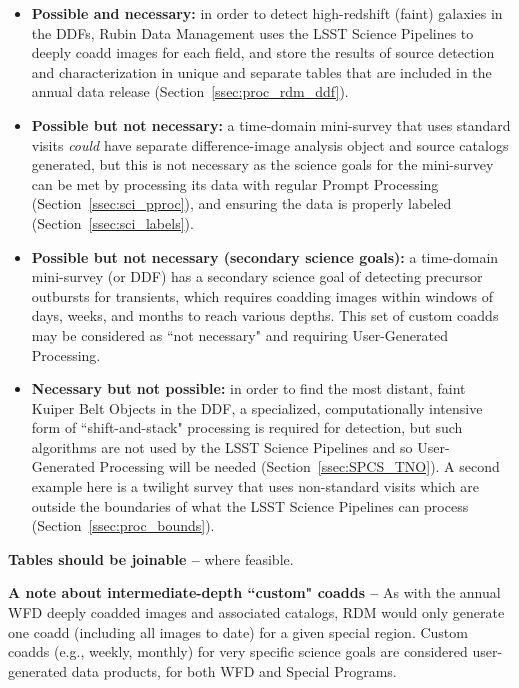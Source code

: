 \begin{itemize}

\item \textbf{Possible and necessary:}
in order to detect high-redshift (faint) galaxies in the DDFs,
Rubin Data Management uses the LSST Science Pipelines to deeply
coadd images for each field, and store the results of source
detection and characterization in unique and separate tables that
are included in the annual data release (Section~\ref{ssec:proc_rdm_ddf}).

\item \textbf{Possible but not necessary:}
a time-domain mini-survey that uses standard visits \emph{could}
have separate difference-image analysis object and source catalogs
generated, but this is not necessary as the science goals for the
mini-survey can be met by processing its data with regular Prompt
Processing (Section~\ref{ssec:sci_pproc}), and ensuring the
data is properly labeled (Section~\ref{ssec:sci_labels}).

\item \textbf{Possible but not necessary (secondary science goals):}
a time-domain mini-survey (or DDF) has a secondary science goal of detecting
precursor outbursts for transients, which requires coadding images
within windows of days, weeks, and months to reach various depths.
This set of custom coadds may be considered as ``not necessary" and requiring 
User-Generated Processing.

\item \textbf{Necessary but not possible:}
in order to find the most distant, faint Kuiper Belt Objects in the DDF,
a specialized, computationally intensive form of ``shift-and-stack" processing
is required for detection, but such algorithms are not used by the 
LSST Science Pipelines and so User-Generated Processing will be needed (Section~\ref{ssec:SPCS_TNO}).
A second example here is a twilight survey that uses non-standard visits 
which are outside the boundaries of what the LSST
Science Pipelines can process (Section~\ref{ssec:proc_bounds}).

\end{itemize}

\textbf{Tables should be joinable -- } where feasible.

\textbf{A note about intermediate-depth ``custom" coadds -- }
As with the annual WFD deeply coadded images and associated catalogs, RDM would 
only generate one coadd (including all images to date) for a given special region.
Custom coadds (e.g., weekly, monthly) for very specific science goals are considered 
user-generated data products, for both WFD and Special Programs.



